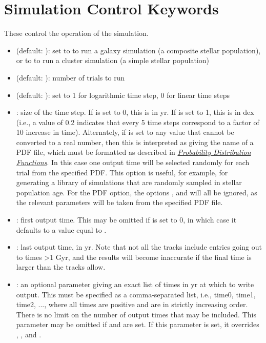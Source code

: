 \documentclass[letterpaper,10pt,english]{sphinxmanual}
\begin{document}
\section{Simulation Control Keywords}
\label{parameters:simulation-control-keywords}
These control the operation of the simulation.
\begin{itemize}
\item {} 
 (default: ): set to  to run a galaxy simulation (a composite stellar population), or to  to run a cluster simulation (a simple stellar population)

\item {} 
 (default: ): number of trials to run

\item {} 
 (default: ): set to 1 for logarithmic time step, 0 for linear time steps

\item {} 
: size of the time step. If  is set to 0, this is in yr. If  is set to 1, this is in dex (i.e., a value of 0.2 indicates that every 5 time steps correspond to a factor of 10 increase in time). Alternately, if  is set to any value that cannot be converted to a real number, then this is interpreted as giving the name of a PDF file, which must be formatted as described in {\hyperref[pdfs:sec\string-pdfs]{\emph{Probability Distribution Functions}}}. In this case one output time will be selected randomly for each trial from the specified PDF. This option is useful, for example, for generating a library of simulations that are randomly sampled in stellar population age. For the PDF option, the options ,  and  will all be ignored, as the relevant parameters will be taken from the specified PDF file.

\item {} 
: first output time. This may be omitted if  is set to 0, in which case it defaults to a value equal to .

\item {} 
: last output time, in yr. Note that not all the tracks include entries going out to times \textgreater{}1 Gyr, and the results will become inaccurate if the final time is larger than the tracks allow.

\item {} 
: an optional parameter giving an exact list of times in yr at which to write output. This must be specified as a comma-separated list, i.e., time0, time1, time2, ..., where all times are positive and are in strictly increasing order. There is no limit on the number of output times that may be included. This parameter may be omitted if  and  are set. If this parameter is set, it overrides , , and .


\end{itemize}
\end{document}
